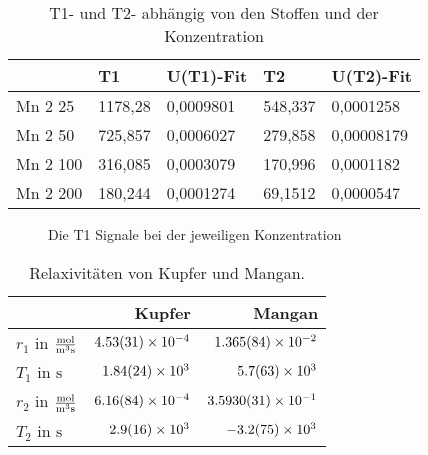 \begin{table}[H]
\begin{tabular}{lllll}
        \multicolumn{1}{|l|}{}            & \multicolumn{1}{l|}{T1}      & \multicolumn{1}{l|}{U(T1)-Fit} & \multicolumn{1}{l|}{T2}      & \multicolumn{1}{l|}{U(T2)-Fit}  \\ \hline
        \multicolumn{1}{|l|}{Mn 2 25}     & \multicolumn{1}{l|}{1178,28} & \multicolumn{1}{l|}{0,0009801} & \multicolumn{1}{l|}{548,337} & \multicolumn{1}{l|}{0,0001258}  \\ \hline
        \multicolumn{1}{|l|}{Mn 2 50}     & \multicolumn{1}{l|}{725,857} & \multicolumn{1}{l|}{0,0006027} & \multicolumn{1}{l|}{279,858} & \multicolumn{1}{l|}{0,00008179} \\ \hline
        \multicolumn{1}{|l|}{Mn 2 100}    & \multicolumn{1}{l|}{316,085} & \multicolumn{1}{l|}{0,0003079} & \multicolumn{1}{l|}{170,996} & \multicolumn{1}{l|}{0,0001182}  \\ \hline
        \multicolumn{1}{|l|}{Mn 2 200}    & \multicolumn{1}{l|}{180,244} & \multicolumn{1}{l|}{0,0001274} & \multicolumn{1}{l|}{69,1512} & \multicolumn{1}{l|}{0,0000547}  \\ \hline
        \end{tabular}
        \caption{T1- und T2- abhängig von den Stoffen und der Konzentration}
\end{table}

\begin{figure}[H]
    \centering
    
    \caption{Die T1 Signale bei der jeweiligen Konzentration}
    \label{fig:T1Signalkontrast}
\end{figure}

\begin{table}[H]
    \centering
    \caption{Relaxivitäten von Kupfer und Mangan.}
    \begin{tabular}{|l||r|r|} \hline
            & Kupfer    & Mangan    \\    \hline \hline
        $r_{1}$ in $\si{\frac{\mol}{\metre \cubed \second}}$    & $\SI{4.53 \pm 0.31e-4}{}$   & $\SI{1.365 \pm 0.084e-2}{}$    \\    \hline
        $T_{1}$ in $\si{\second}$                               & $\SI{1.84 \pm 0.24e3}{}$    & $\SI{5.7    \pm 6.3e3}{}$       \\    \hline
        $r_{2}$ in $\si{\frac{\mol}{\metre \cubed \second}}$    & $\SI{6.16 \pm 0.84e-4}{}$   & $\SI{3.593  \pm 0.0031e-1}{}$   \\    \hline
        $T_{2}$ in $\si{\second}$                               & $\SI{2.9  \pm 1.6e3}{}$     & $\SI{-3.2   \pm 7.5e3}{}$       \\    \hline
    \end{tabular} 
    \label{tab:Relaxivitat} 
\end{table}
    

